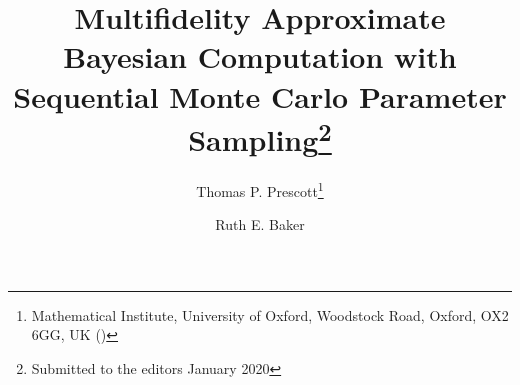 \usepackage{amssymb, amsmath}
\usepackage{algorithmic}
\usepackage{cleveref}
\usepackage{graphicx}
\usepackage[caption=false]{subfig}


\usepackage{enumitem}



\title{Multifidelity Approximate Bayesian Computation with Sequential Monte Carlo Parameter Sampling\thanks{
Submitted to the editors January 2020 }}

\author{
Thomas P. Prescott\thanks{Mathematical Institute, University of Oxford, Woodstock Road, Oxford, OX2 6GG, UK ()}
\and Ruth E. Baker\footnotemark[2]
}



\newcommand{\obs}[1]{#1_{\mathrm{obs}}}
\newcommand{\tp}[1]{#1_{\mathrm{tp}}}
\newcommand{\fp}[1]{#1_{\mathrm{fp}}}
\newcommand{\fn}[1]{#1_{\mathrm{fn}}}
\renewcommand{\algorithmicrequire}{\textbf{Input:}}
\renewcommand{\algorithmicensure}{\textbf{Output:}}

\graphicspath{{figs/out/png/}}

